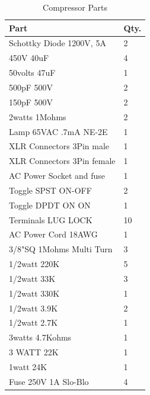 \documentclass[journal]{IEEEtran}
\begin{document}
	\begin{table}[]
		\centering
		\caption{Compressor Parts}
		\label{tab:compressorParts}
		\begin{tabular}{l|l}
			Part                           & Qty. \\\hline
			Schottky Diode 1200V, 5A              & 2          \\
			450V 40uF                             & 4          \\
			50volts 47uF                          & 1          \\
			500pF 500V                            & 2          \\
			150pF 500V                            & 2          \\
			2watts 1Mohms                         & 2          \\
			Lamp 65VAC .7mA NE-2E                 & 1          \\
			XLR Connectors 3Pin male                & 1          \\
			XLR Connectors 3Pin female              & 1          \\
			AC Power Socket and fuse              & 1          \\
			Toggle SPST ON-OFF                    & 2          \\
			Toggle DPDT ON ON                     & 1          \\
			Terminals LUG LOCK                    & 10         \\
			AC Power Cord 18AWG                   & 1          \\
			3/8"SQ 1Mohms Multi Turn              & 3          \\
			1/2watt 220K                          & 5          \\
			1/2watt 33K                           & 3          \\
			1/2watt 330K                          & 1          \\
			1/2watt 3.9K                          & 2          \\
			1/2watt 2.7K                          & 1          \\
			3watts 4.7Kohms                       & 1          \\
			3 WATT 22K                            & 1          \\
			1watt 24K                             & 1          \\
			Fuse 250V 1A Slo-Blo                  & 4          \\

\end{tabular}
\end{table}
\end{document}
